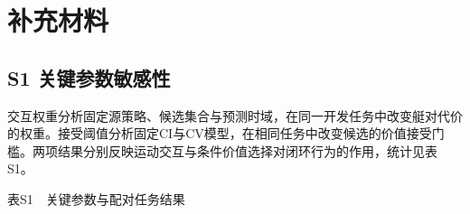 \documentclass[UTF8,10.5pt,a4paper,fontset=none]{ctexart}
\begin{document}
\endgroup
\clearpage
\section{补充材料}\label{ux8865ux5145ux6750ux6599}

\subsection{S1
关键参数敏感性}\label{s1-ux5173ux952eux53c2ux6570ux654fux611fux6027}

交互权重分析固定源策略、候选集合与预测时域，在同一开发任务中改变艇对代价的权重。接受阈值分析固定CI与CV模型，在相同任务中改变候选的价值接受门槛。两项结果分别反映运动交互与条件价值选择对闭环行为的作用，统计见表S1。

\begin{center}\small 表S1　关键参数与配对任务结果\end{center}
\end{document}
